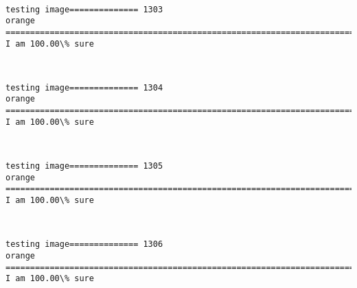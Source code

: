 \documentclass[11pt]{article}
\begin{document}
    \begin{center}
    \end{center}
    { \hspace*{\fill} \\}
    
    \begin{Verbatim}[commandchars=\\\{\}]
testing image============== 1303
orange
============================================================================
I am 100.00\% sure

    \end{Verbatim}

    \begin{center}
    \end{center}
    { \hspace*{\fill} \\}
    
    \begin{Verbatim}[commandchars=\\\{\}]
testing image============== 1304
orange
============================================================================
I am 100.00\% sure

    \end{Verbatim}

    \begin{center}
    \end{center}
    { \hspace*{\fill} \\}
    
    \begin{Verbatim}[commandchars=\\\{\}]
testing image============== 1305
orange
============================================================================
I am 100.00\% sure

    \end{Verbatim}

    \begin{center}
    \end{center}
    { \hspace*{\fill} \\}
    
    \begin{Verbatim}[commandchars=\\\{\}]
testing image============== 1306
orange
============================================================================
I am 100.00\% sure

    \end{Verbatim}
\end{document}

